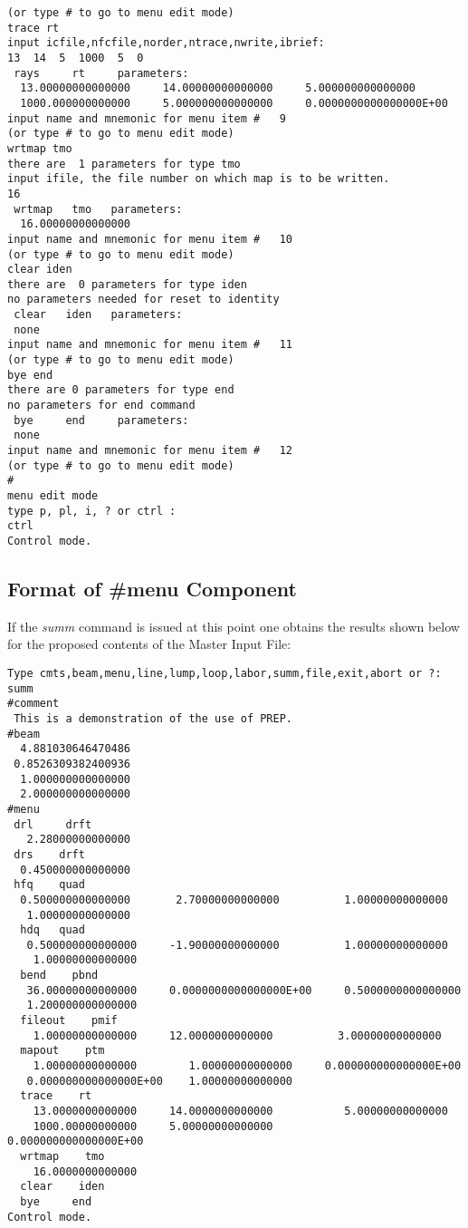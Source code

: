 \begin{footnotesize}
\begin{verbatim}
(or type # to go to menu edit mode)
trace rt
input icfile,nfcfile,norder,ntrace,nwrite,ibrief:
13  14  5  1000  5  0
 rays     rt     parameters:
  13.00000000000000     14.00000000000000     5.000000000000000
  1000.000000000000     5.000000000000000     0.0000000000000000E+00
input name and mnemonic for menu item #   9
(or type # to go to menu edit mode)
wrtmap tmo
there are  1 parameters for type tmo
input ifile, the file number on which map is to be written.
16
 wrtmap   tmo   parameters:
  16.00000000000000
input name and mnemonic for menu item #   10
(or type # to go to menu edit mode)
clear iden
there are  0 parameters for type iden
no parameters needed for reset to identity
 clear   iden   parameters:
 none
input name and mnemonic for menu item #   11
(or type # to go to menu edit mode)
bye end
there are 0 parameters for type end
no parameters for end command
 bye     end     parameters:
 none
input name and mnemonic for menu item #   12
(or type # to go to menu edit mode)
#
menu edit mode
type p, pl, i, ? or ctrl :
ctrl
Control mode.
\end{verbatim}
\end{footnotesize}


\subsection{Format of \#menu Component} If the {\em summ} command is issued
at this point one obtains the results shown below for the proposed contents
of the Master Input File:

\begin{footnotesize}
\begin{verbatim}
Type cmts,beam,menu,line,lump,loop,labor,summ,file,exit,abort or ?:
summ
#comment
 This is a demonstration of the use of PREP.
#beam
  4.881030646470486
 0.8526309382400936
  1.000000000000000
  2.000000000000000
#menu
 drl     drft
   2.28000000000000
 drs    drft
  0.450000000000000
 hfq    quad
  0.500000000000000       2.70000000000000          1.00000000000000
   1.00000000000000
  hdq   quad
   0.500000000000000     -1.90000000000000          1.00000000000000
    1.00000000000000
  bend    pbnd
   36.00000000000000     0.0000000000000000E+00     0.5000000000000000
   1.200000000000000
  fileout    pmif
    1.00000000000000     12.0000000000000          3.00000000000000
  mapout    ptm
    1.00000000000000        1.00000000000000     0.000000000000000E+00
   0.000000000000000E+00    1.00000000000000
  trace    rt
    13.0000000000000     14.0000000000000           5.00000000000000
    1000.00000000000     5.00000000000000          0.000000000000000E+00
  wrtmap    tmo
    16.0000000000000
  clear    iden
  bye     end
Control mode.
\end{verbatim}
\end{footnotesize}


